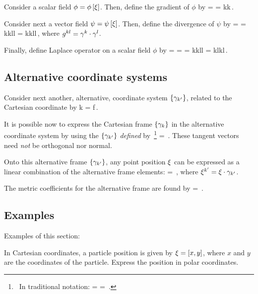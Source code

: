 Consider a scalar field $\phi = \phi\left[{\xi}\right]$. Then, define the gradient of $\phi$ by
\beq
\grad\phi = \gder\phi 
          = \rbvec k\igder k\phi\,.
\eeq

Consider next a vector field $\psi = \psi\left[{\xi}\right]$. Then, define the divergence of $\psi$ by
\beq
\div\psi = \gder\iprod\psi 
         = \rbvec k\igder k\iprod\rbvec l\rvec\psi l 
         = \ipd k\rmet kl\rvec\psi l\,,
\eeq
where $g^{{k}{l}} = \gamma^{k}\cdot\gamma^{l}$.

Finally, define Laplace operator on a scalar field $\phi$ by
\beq
\lap\phi = \div\grad\phi 
         = \gder\iprod\gder\phi
         = \rbvec k\igder k\iprod\rbvec l\igder l\phi
         = \igder k\igder l\rmet kl\phi\,.
\eeq


\subsection{Alternative coordinate systems}
Consider next another, alternative, coordinate system $\left\lbrace{\gamma_{k'}}\right\rbrace$, related to the Cartesian coordinate by
\beq
\fvec\pos k = f\,.
\eeq

It is possible now to express the Cartesian frame $\left\lbrace{\gamma_{k}}\right\rbrace$ in the alternative coordinate system by using the  $\left\lbrace{\gamma_{k'}}\right\rbrace$ \emph{defined} by~\footnote{~In traditional notation:
\beq
{} =  = \,.
\eeq}
\beq
{} = \pos\,.
\eeq
These tangent vectors need \emph{not} be orthogonal nor normal.

Onto this alternative frame $\left\lbrace{\gamma_{k'}}\right\rbrace$, any point position $\xi$ can be expressed as a linear combination of the alternative frame elements:
\beq
\pos = \fvec{}\,,
\eeq
where ${\xi}^{k'} = \xi\cdot\gamma_{k'}$.

The metric coefficients for the alternative frame are found by
\beq
{} = \iprod{}\,.
\eeq


\subsection{Examples}
Examples of this section:

\begin{example}
In Cartesian coordinates, a particle position is given by $\xi = \left[{x,y}\right]$, where $x$ and $y$ are the coordinates of the particle. Express the position in polar coordinates.
\end{example}

